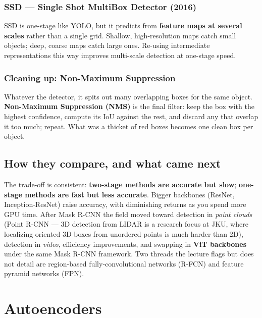 \documentclass[11pt, oneside]{book}
\begin{document}
\subsection{SSD --- Single Shot MultiBox Detector (2016)}

SSD is one-stage like YOLO, but it predicts from \textbf{feature maps at several
scales} rather than a single grid. Shallow, high-resolution maps catch small
objects; deep, coarse maps catch large ones. Re-using intermediate
representations this way improves multi-scale detection at one-stage speed.

\subsection{Cleaning up: Non-Maximum Suppression}

Whatever the detector, it spits out many overlapping boxes for the same object.
\textbf{Non-Maximum Suppression (NMS)} is the final filter: keep the box with the
highest confidence, compute its IoU against the rest, and discard any that overlap
it too much; repeat. What was a thicket of red boxes becomes one clean box per
object.

\section{How they compare, and what came next}

The trade-off is consistent: \textbf{two-stage methods are accurate but slow};
\textbf{one-stage methods are fast but less accurate}. Bigger backbones (ResNet,
Inception-ResNet) raise accuracy, with diminishing returns as you spend more GPU
time. After Mask R-CNN the field moved toward detection in \emph{point clouds}
(Point R-CNN --- 3D detection from LIDAR is a research focus at JKU, where
localizing oriented 3D boxes from unordered points is much harder than 2D),
detection in \emph{video}, efficiency improvements, and swapping in
\textbf{ViT backbones} under the same Mask R-CNN framework. Two threads the
lecture flags but does not detail are region-based fully-convolutional networks
(R-FCN) and feature pyramid networks (FPN).


\chapter{Autoencoders}
\end{document}
